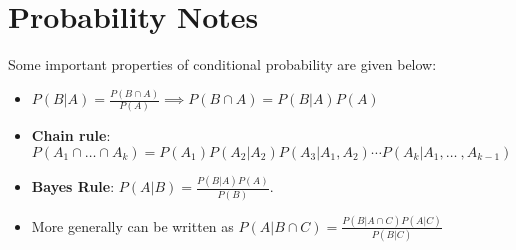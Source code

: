 \documentclass[11pt]{article}
\begin{document}
    \section*{Probability Notes}

    Some important properties of conditional probability are given below:

    \begin{itemize}
        \item $\displaystyle P(B | A) = \frac{P(B \cap A)}{P(A)} \implies P(B \cap A)=P(B|A)P(A)$
        \item \textbf{Chain rule}: $\displaystyle P(A_1 \cap \ldots \cap A_k)=P(A_1)P(A_2|A_2)P(A_3|A_1, A_2)\cdots P
        (A_k|A_1, \ldots\ ,  A_{k-1})$
        \item \textbf{Bayes Rule}: $\displaystyle P(A|B)=\frac{P(B|A)P(A)}{P(B)}$.
        \item More generally can be written as $\displaystyle P(A | B \cap C)=\frac{P(B|A \cap C)P(A|C)}{P(B|C)}$
    \end{itemize}
\end{document}
